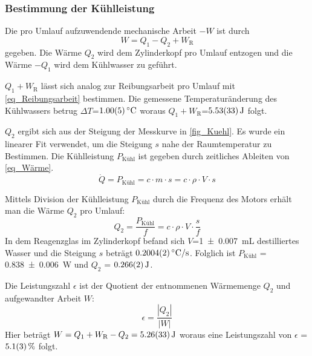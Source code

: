 \documentclass[
	a4paper,
	12pt,
	pagesize,
	ngerman
]{scrartcl}
\begin{document}
	\subsubsection{Bestimmung der Kühlleistung} \label{sssec_Kühlleistung}
	Die pro Umlauf aufzuwendende mechanische Arbeit $-W$ ist durch
	\begin{equation}
	W =  Q_1 - Q_2 + W_\text{R}
	\end{equation}
	gegeben.
	Die Wärme $Q_2$ wird dem Zylinderkopf pro Umlauf entzogen und die Wärme $-Q_1$ wird dem Kühlwasser zu geführt.
	
	$Q_1+W_\text{R}$ lässt sich analog zur Reibungsarbeit pro Umlauf mit \cref{eq_Reibungsarbeit} bestimmen.	
	Die gemessene Temperaturänderung des Kühlwassers betrug $\Delta{T}$=$\SI{1,0+-0,05}{\degreeCelsius}$ woraus $Q_1+W_\text{R}$=$\SI{5,53+-0,33}{J}$ folgt.
	
	$Q_2$ ergibt sich aus der Steigung der Messkurve in \cref{fig_Kuehl}.
	Es wurde ein linearer Fit verwendet, um die Steigung $s$ nahe der Raumtemperatur zu Bestimmen.
	Die Kühlleistung $P_\text{Kühl}$ ist gegeben durch zeitliches Ableiten von \cref{eq_Wärme}.
	\begin{equation}
	\dot{Q} = P_\text{Kühl} = c \cdot m \cdot s = c \cdot \rho \cdot V \cdot s 
	\label{eq_Kühlleistung}
	\end{equation}
	
	Mittels Division der Kühlleistung $P_\text{Kühl}$ durch die Frequenz des Motors erhält man die Wärme $Q_2$ pro Umlauf:
	\begin{equation}
	Q_2 = \frac{P_\text{Kühl}}{f} = c \cdot \rho \cdot V \cdot \frac{s}{f}	
	\end{equation}
	In dem Reagenzglas im Zylinderkopf befand sich $V$=\SI{1+- 0,007}{mL} destilliertes Wasser und die Steigung $s$ beträgt $\SI{0,2004+-0,0002}{\degreeCelsius/s}$.
	Folglich ist $P_\text{Kühl}$ = \SI{0,838+-0,006}{W} und $Q_2$ = $\SI{0,266+-0,002}{J}$.
	
	Die Leistungszahl $\epsilon$ ist der Quotient der entnommenen Wärmemenge $Q_2$ und aufgewandter Arbeit $W$:
	\begin{equation}
		\epsilon = \frac{|Q_2|}{|W|}
		\label{eq_Leistungszahl}
	\end{equation}
	Hier beträgt $W=Q_1+W_\text{R}-Q_2=\SI{5,26+-0,33}{J}$ woraus eine Leistungszahl von $\epsilon$ = $\SI{5,1 +- 0,3}{\%}$ folgt.
	
\end{document}

